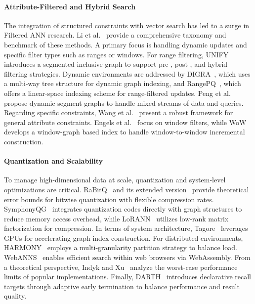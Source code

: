 \documentclass[sigconf,anonymous]{acmart}
\theoremstyle{plain}
\theoremstyle{definition}
\theoremstyle{remark}
\begin{document}
\paragraph{Attribute-Filtered and Hybrid Search}
The integration of structured constraints with vector search has led to a surge in Filtered ANN research. Li et al.~\cite{10.1145/3769763} provide a comprehensive taxonomy and benchmark of these methods. 
A primary focus is handling dynamic updates and specific filter types such as ranges or windows. 
For range filtering, UNIFY~\cite{10.14778/3717755.3717770} introduces a segmented inclusive graph to support pre-, post-, and hybrid filtering strategies. 
Dynamic environments are addressed by DIGRA~\cite{10.1145/3725399}, which uses a multi-way tree structure for dynamic graph indexing, and RangePQ~\cite{10.1145/3725401}, which offers a linear-space indexing scheme for range-filtered updates. 
Peng et al.~\cite{10.14778/3748191.3748193} propose dynamic segment graphs to handle mixed streams of data and queries.
Regarding specific constraints, Wang et al.~\cite{DBLP:conf/nips/WangLX0YN23} present a robust framework for general attribute constraints. 
Engels et al.~\cite{engels2024approximate} focus on window filters, while WoW~\cite{10.1145/3769843} develops a window-graph based index to handle window-to-window incremental construction.

\paragraph{Quantization and Scalability}
To manage high-dimensional data at scale, quantization and system-level optimizations are critical. 
RaBitQ~\cite{10.1145/3654970} and its extended version~\cite{10.1145/3725413} provide theoretical error bounds for bitwise quantization with flexible compression rates. 
SymphonyQG~\cite{10.1145/3709730} integrates quantization codes directly with graph structures to reduce memory access overhead, while LoRANN~\cite{DBLP:conf/nips/JaasaariHR24} utilizes low-rank matrix factorization for compression.
In terms of system architecture, Tagore~\cite{10.1145/3769825} leverages GPUs for accelerating graph index construction. 
For distributed environments, HARMONY~\cite{10.1145/3749167} employs a multi-granularity partition strategy to balance load. 
WebANNS~\cite{10.1145/3726302.3730115} enables efficient search within web browsers via WebAssembly. 
From a theoretical perspective, Indyk and Xu~\cite{DBLP:conf/nips/IndykX23} analyze the worst-case performance limits of popular implementations. 
Finally, DARTH~\cite{10.1145/3749160} introduces declarative recall targets through adaptive early termination to balance performance and result quality.
\end{document}
